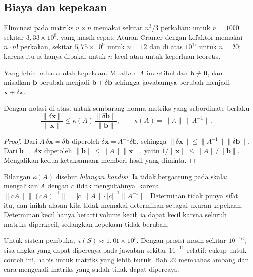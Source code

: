 \subsection*{Biaya dan kepekaan}

Eliminasi pada matriks $n\times n$ memakai sekitar $n^{3}/3$ perkalian: untuk $n=1000$
sekitar $3{,}33\times10^{8}$, yang masih cepat. Aturan Cramer dengan kofaktor memakai
$n\cdot n!$ perkalian, sekitar $5{,}75\times10^{9}$ untuk $n=12$ dan di atas $10^{19}$ untuk
$n=20$; karena itu ia hanya dipakai untuk $n$ kecil atau untuk keperluan teoretis.

Yang lebih halus adalah kepekaan. Misalkan $A$ invertibel dan $\mathbf{b}\neq\mathbf{0}$,
dan misalkan $\mathbf{b}$ berubah menjadi $\mathbf{b}+\delta\mathbf{b}$ sehingga jawabannya
berubah menjadi $\mathbf{x}+\delta\mathbf{x}$.

\begin{teorema}
Dengan notasi di atas, untuk sembarang norma matriks yang subordinate berlaku
\[
  \frac{\lVert\delta\mathbf{x}\rVert}{\lVert\mathbf{x}\rVert}
  \le\kappa(A)\,
  \frac{\lVert\delta\mathbf{b}\rVert}{\lVert\mathbf{b}\rVert},
  \qquad \kappa(A)=\lVert A\rVert\,\lVert A^{-1}\rVert .
\]
\end{teorema}

\begin{proof}
Dari $A\,\delta\mathbf{x}=\delta\mathbf{b}$ diperoleh
$\delta\mathbf{x}=A^{-1}\delta\mathbf{b}$, sehingga
$\lVert\delta\mathbf{x}\rVert\le\lVert A^{-1}\rVert\lVert\delta\mathbf{b}\rVert$.
Dari $\mathbf{b}=A\mathbf{x}$ diperoleh
$\lVert\mathbf{b}\rVert\le\lVert A\rVert\lVert\mathbf{x}\rVert$, yaitu
$1/\lVert\mathbf{x}\rVert\le\lVert A\rVert/\lVert\mathbf{b}\rVert$. Mengalikan kedua
ketaksamaan memberi hasil yang diminta.
\end{proof}

Bilangan $\kappa(A)$ disebut \emph{bilangan kondisi}. Ia tidak bergantung pada skala:
mengalikan $A$ dengan $c$ tidak mengubahnya, karena $\lVert cA\rVert\lVert (cA)^{-1}\rVert
=|c|\lVert A\rVert\cdot|c|^{-1}\lVert A^{-1}\rVert$. Determinan tidak punya sifat itu, dan
inilah alasan kita tidak memakai determinan sebagai ukuran kepekaan. Determinan kecil hanya
berarti volume kecil; ia dapat kecil karena seluruh matriks diperkecil, sedangkan kepekaan
tidak berubah.

Untuk sistem pembuka, $\kappa(S)\approx1{,}01\times10^{5}$. Dengan presisi mesin sekitar
$10^{-16}$, sisa angka yang dapat dipercaya pada jawaban sekitar $10^{-11}$ relatif: cukup
untuk contoh ini, habis untuk matriks yang lebih buruk. Bab 22 membahas ambang dan cara
mengenali matriks yang sudah tidak dapat dipercaya.

